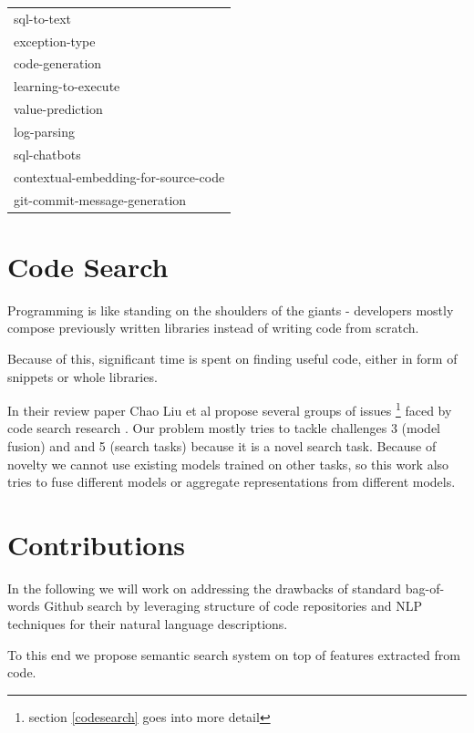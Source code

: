 \documentclass[11pt]{report}
\begin{document}
\begin{table}[htbp]
\begin{tabular}{|l|}
                                   sql-to-text \\
                                exception-type \\
                               code-generation \\
                           learning-to-execute \\
                              value-prediction \\
                                   log-parsing \\
                                  sql-chatbots \\
          contextual-embedding-for-source-code \\
                 git-commit-message-generation \\
\bottomrule
\hline
\end{tabular}
\end{table}


\section{Code Search}


Programming is like standing on the shoulders of the giants - developers mostly compose previously written libraries instead of writing code from scratch.

Because of this, significant time is spent on finding useful code, either in form of snippets or whole libraries.

In their review paper Chao Liu et al \cite{code_search} propose several groups of issues \footnote{section \ref{codesearch} goes into more detail} faced by code search research . Our problem mostly tries to tackle challenges 3 (model fusion) and  and 5 (search tasks) because it is a novel search task. 
Because of novelty we cannot use existing models trained on other tasks, so this work also tries to fuse different models or aggregate representations from different models.

\section{Contributions}



In the following we will work on addressing the drawbacks of standard bag-of-words Github search by leveraging structure of code repositories and NLP techniques for their natural language descriptions.

To this end we propose semantic search system on top of features extracted from code.
\end{document}
